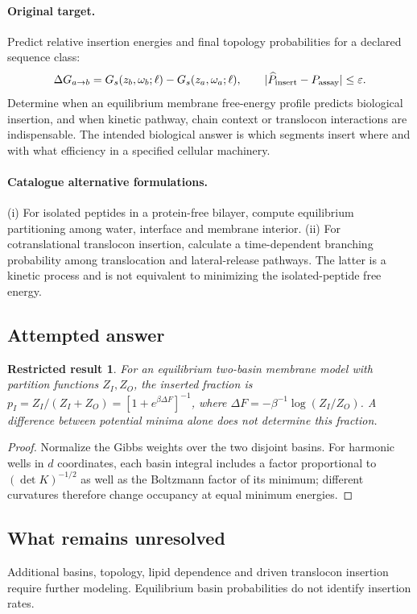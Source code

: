 \documentclass[11pt]{article}
\newtheorem{attemptresult}{Restricted result}[section]
\begin{document}
\paragraph{Original target.}
Predict relative insertion energies and final topology probabilities for a declared sequence class:
\[\Delta G_{a\to b}=G_s(z_b,\omega_b;\ell)-G_s(z_a,\omega_a;\ell),\qquad |\widehat P_{\rm insert}-P_{\rm assay}|\le\varepsilon.\]
Determine when an equilibrium membrane free-energy profile predicts biological insertion, and when kinetic pathway, chain context or translocon interactions are indispensable. The intended biological answer is which segments insert where and with what efficiency in a specified cellular machinery.
\paragraph{Catalogue alternative formulations.}
(i) For isolated peptides in a protein-free bilayer, compute equilibrium partitioning among water, interface and membrane interior. (ii) For cotranslational translocon insertion, calculate a time-dependent branching probability among translocation and lateral-release pathways. The latter is a kinetic process and is not equivalent to minimizing the isolated-peptide free energy.
\subsection{Attempted answer}
\begin{attemptresult}
For an equilibrium two-basin membrane model with partition functions $Z_I,Z_O$, the inserted fraction is $p_I=Z_I/(Z_I+Z_O)=[1+e^{\beta\Delta F}]^{-1}$, where $\Delta F=-\beta^{-1}\log(Z_I/Z_O)$. A difference between potential minima alone does not determine this fraction.
\end{attemptresult}
\begin{proof}
Normalize the Gibbs weights over the two disjoint basins. For harmonic wells in $d$ coordinates, each basin integral includes a factor proportional to $(\det K)^{-1/2}$ as well as the Boltzmann factor of its minimum; different curvatures therefore change occupancy at equal minimum energies.
\end{proof}
\subsection{What remains unresolved}
Additional basins, topology, lipid dependence and driven translocon insertion require further modeling. Equilibrium basin probabilities do not identify insertion rates.
\end{document}
